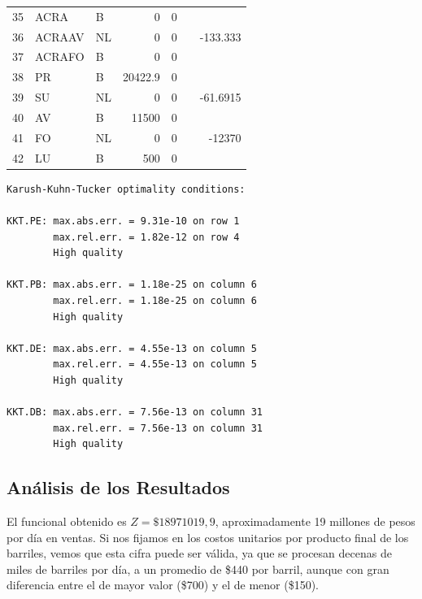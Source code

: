 \documentclass[a4paper,10pt]{article}
\begin{document}
\begin{center}
\begin{tabular}{| l  l  l  r  r  c  r |}
     35 &   ACRA &           B &                0 &               0 &                &		\\                
     36 &   ACRAAV &         NL &               0 &               0 &                &      -133.333 \\ 
     37 &   ACRAFO &         B &                0 &               0 &                &		\\ \hline               
     38 &   PR &             B &          20422.9 &               0 &                &		\\                
     39 &   SU &             NL &               0 &               0 &                &      -61.6915 \\ 
     40 &   AV &             B &            11500 &               0 &                &		\\                
     41 &   FO &             NL &               0 &               0 &                &        -12370 \\ 
     42 &   LU &             B &              500 &               0 &                &		\\                
\hline
       \end{tabular}
\end{center}
\newpage

\begin{verbatim}
Karush-Kuhn-Tucker optimality conditions:

KKT.PE: max.abs.err. = 9.31e-10 on row 1
        max.rel.err. = 1.82e-12 on row 4
        High quality

KKT.PB: max.abs.err. = 1.18e-25 on column 6
        max.rel.err. = 1.18e-25 on column 6
        High quality

KKT.DE: max.abs.err. = 4.55e-13 on column 5
        max.rel.err. = 4.55e-13 on column 5
        High quality

KKT.DB: max.abs.err. = 7.56e-13 on column 31
        max.rel.err. = 7.56e-13 on column 31
        High quality

\end{verbatim}


\subsection{An\'alisis de los Resultados}

El funcional obtenido es $Z = \$18971019,9$, aproximadamente 19 millones de pesos por d\'ia en ventas. Si nos fijamos en los costos unitarios por producto final de los barriles, vemos que esta cifra puede ser v\'alida, ya que se procesan decenas de miles de barriles por d\'ia, a un promedio de \$440 por barril, aunque con gran diferencia entre el de mayor valor (\$700) y el de menor (\$150).
\\
\end{document}
